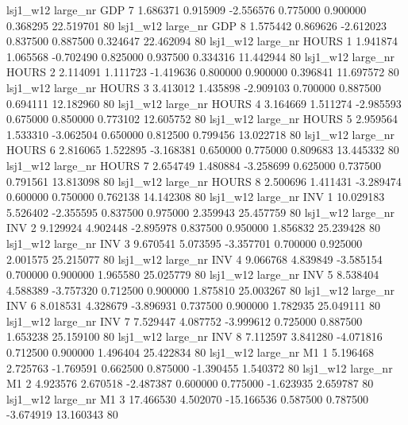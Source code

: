     lsj1_w12   large_nr      GDP                 7  1.686371  0.915909  -2.556576 0.775000 0.900000  0.368295   22.519701 80
    lsj1_w12   large_nr      GDP                 8  1.575442  0.869626  -2.612023 0.837500 0.887500  0.324647   22.462094 80
    lsj1_w12   large_nr    HOURS                 1  1.941874  1.065568  -0.702490 0.825000 0.937500  0.334316   11.442944 80
    lsj1_w12   large_nr    HOURS                 2  2.114091  1.111723  -1.419636 0.800000 0.900000  0.396841   11.697572 80
    lsj1_w12   large_nr    HOURS                 3  3.413012  1.435898  -2.909103 0.700000 0.887500  0.694111   12.182960 80
    lsj1_w12   large_nr    HOURS                 4  3.164669  1.511274  -2.985593 0.675000 0.850000  0.773102   12.605752 80
    lsj1_w12   large_nr    HOURS                 5  2.959564  1.533310  -3.062504 0.650000 0.812500  0.799456   13.022718 80
    lsj1_w12   large_nr    HOURS                 6  2.816065  1.522895  -3.168381 0.650000 0.775000  0.809683   13.445332 80
    lsj1_w12   large_nr    HOURS                 7  2.654749  1.480884  -3.258699 0.625000 0.737500  0.791561   13.813098 80
    lsj1_w12   large_nr    HOURS                 8  2.500696  1.411431  -3.289474 0.600000 0.750000  0.762138   14.142308 80
    lsj1_w12   large_nr      INV                 1 10.029183  5.526402  -2.355595 0.837500 0.975000  2.359943   25.457759 80
    lsj1_w12   large_nr      INV                 2  9.129924  4.902448  -2.895978 0.837500 0.950000  1.856832   25.239428 80
    lsj1_w12   large_nr      INV                 3  9.670541  5.073595  -3.357701 0.700000 0.925000  2.001575   25.215077 80
    lsj1_w12   large_nr      INV                 4  9.066768  4.839849  -3.585154 0.700000 0.900000  1.965580   25.025779 80
    lsj1_w12   large_nr      INV                 5  8.538404  4.588389  -3.757320 0.712500 0.900000  1.875810   25.003267 80
    lsj1_w12   large_nr      INV                 6  8.018531  4.328679  -3.896931 0.737500 0.900000  1.782935   25.049111 80
    lsj1_w12   large_nr      INV                 7  7.529447  4.087752  -3.999612 0.725000 0.887500  1.653238   25.159100 80
    lsj1_w12   large_nr      INV                 8  7.112597  3.841280  -4.071816 0.712500 0.900000  1.496404   25.422834 80
    lsj1_w12   large_nr       M1                 1  5.196468  2.725763  -1.769591 0.662500 0.875000 -1.390455    1.540372 80
    lsj1_w12   large_nr       M1                 2  4.923576  2.670518  -2.487387 0.600000 0.775000 -1.623935    2.659787 80
    lsj1_w12   large_nr       M1                 3 17.466530  4.502070 -15.166536 0.587500 0.787500 -3.674919   13.160343 80

